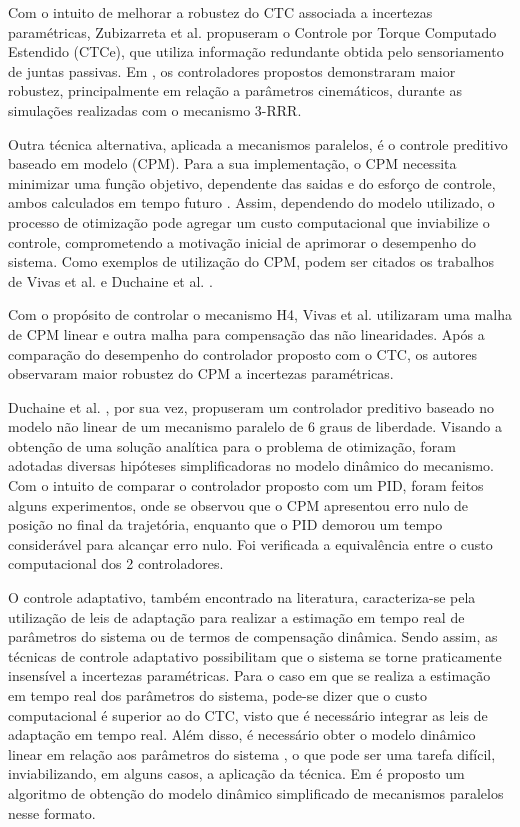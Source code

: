 \documentclass[]{politex}
\begin{document}
Com o intuito de melhorar a robustez do CTC associada a incertezas paramétricas, Zubizarreta et al. \cite{Zubizarreta, Zubizarreta2, Zubizarreta3, Zubizarreta4} propuseram  o  Controle por Torque Computado Estendido (CTCe), que utiliza informação redundante obtida pelo sensoriamento de juntas passivas. Em \cite{Zubizarreta}, os controladores propostos demonstraram maior robustez, principalmente em relação a parâmetros cinemáticos, durante as simulações realizadas com o mecanismo 3-RRR.

Outra técnica alternativa, aplicada a mecanismos paralelos, é o controle preditivo baseado em modelo (CPM). Para a sua implementação, o CPM necessita minimizar uma função objetivo, dependente das saidas e do esforço de controle, ambos calculados em tempo futuro \cite{Camacho}. Assim, dependendo do modelo utilizado, o processo de otimização pode agregar um custo computacional que inviabilize o controle, comprometendo a motivação inicial de aprimorar o desempenho do sistema. Como exemplos de utilização do CPM, podem ser citados os trabalhos de Vivas et al. \cite{Vivas} e   Duchaine et al. \cite{Duchaine}.

Com o propósito de controlar o mecanismo H4, Vivas et al. \cite{Vivas} utilizaram  uma malha de CPM linear e outra malha para compensação das não linearidades. Após a comparação do desempenho do controlador proposto com  o CTC, os autores observaram maior robustez do CPM a incertezas paramétricas. 

Duchaine et al. \cite{Duchaine}, por sua vez, propuseram um controlador preditivo baseado no modelo não linear de um mecanismo paralelo de 6 graus de liberdade. Visando a obtenção de uma solução analítica para o problema de otimização, foram adotadas diversas hipóteses simplificadoras no modelo dinâmico do mecanismo. Com o intuito de comparar o controlador proposto com um PID, foram feitos alguns experimentos, onde se observou  que o CPM apresentou erro nulo de posição no final da trajetória, enquanto que o PID demorou um tempo considerável para alcançar erro nulo. Foi verificada a equivalência entre o custo computacional dos 2 controladores. 

O controle adaptativo, também encontrado na literatura, caracteriza-se pela utilização de leis de adaptação para realizar a estimação em tempo real de parâmetros do sistema ou de termos de compensação dinâmica. Sendo assim, as técnicas de controle adaptativo possibilitam que o sistema se torne praticamente insensível a incertezas paramétricas. Para o caso em que se realiza a estimação em tempo real dos parâmetros do sistema, pode-se dizer que o custo computacional é superior ao do CTC, visto que é necessário integrar as leis de adaptação em tempo real. Além disso, é necessário obter o modelo dinâmico linear em relação aos parâmetros do sistema \cite{SlotiniA}, o que pode ser uma tarefa difícil, inviabilizando, em alguns casos, a aplicação da técnica. Em \cite{Codourey2} é proposto um algoritmo de obtenção do modelo dinâmico simplificado de mecanismos paralelos nesse formato.
\end{document}
